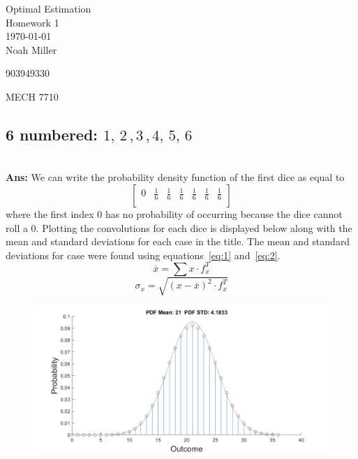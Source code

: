 \documentclass[12pt,letterpaper, onecolumn]{exam}
\begin{document}
\begingroup
\centering
\LARGE Optimal Estimation\\
\LARGE Homework 1 \\[0.5em]
\large \today\\[0.5em]
\large Noah Miller\par
\large 903949330\par
\large MECH 7710\par
\endgroup
\pointsdroppedatright   %
\printanswers
\renewcommand{\solution}{\noindent\textbf{Ans:}\enspace}   %



\begin{questions}
	\begin{parts}
		\part{6 numbered: $1,\,2\,,3\,,4,\,5,\,6$}\\
		\solution
		We can write the probability density function of the first dice as equal to
		\[
			\begin{bmatrix}
				0 & \frac{1}{6} & \frac{1}{6} & \frac{1}{6} & \frac{1}{6} & \frac{1}{6} & \frac{1}{6} \\
			\end{bmatrix} \]
		where the first index $0$ has no probability of occurring because the dice cannot roll a 0. Plotting the convolutions for each dice is displayed below along with the mean and standard deviations for each case in the title. The mean and standard deviations for case were found using equations~\ref{eq:1} and~\ref{eq:2}.
		\begin{equation}\label{eq:1}
			\overline{x} = \sum x \cdot f_x^T
		\end{equation}
		\begin{equation}\label{eq:2}
			\sigma_x = \sqrt{(x - \overline{x})^2 \cdot f_x^T}
		\end{equation}
		\begin{figure}[!h]
			\centering
			\includegraphics[width=.91\linewidth]{Q1_a.png}
		\end{figure}
		\clearpage

\end{parts}
\end{questions}
\end{document}
